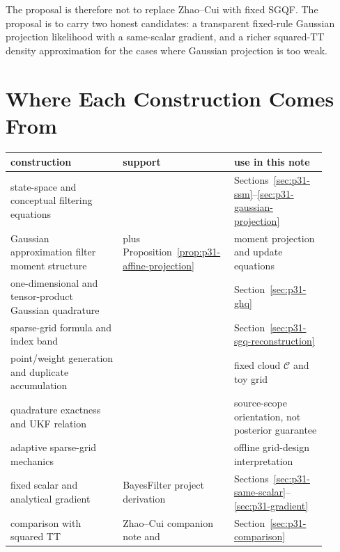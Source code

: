 \documentclass[11pt]{article}
\numberwithin{equation}{section}
\begin{document}
The proposal is therefore not to replace Zhao--Cui with fixed SGQF.  The
proposal is to carry two honest candidates: a transparent fixed-rule Gaussian
projection likelihood with a same-scalar gradient, and a richer squared-TT
density approximation for the cases where Gaussian projection is too weak.

\section{Where Each Construction Comes From}
\label{sec:p31-source-map}

\begin{center}
\small
\begin{tabular}{p{0.34\linewidth}p{0.28\linewidth}p{0.28\linewidth}}
\toprule
construction & support & use in this note \\
\midrule
state-space and conceptual filtering equations & \citet[Section 2]{jia2012sparsegrid} & Sections~\ref{sec:p31-ssm}--\ref{sec:p31-gaussian-projection} \\
Gaussian approximation filter moment structure & \citet[Eq. 15--23]{jia2012sparsegrid} plus Proposition~\ref{prop:p31-affine-projection} & moment projection and update equations \\
one-dimensional and tensor-product Gaussian quadrature & \citet[Section 2.2.1]{jia2012sparsegrid} & Section~\ref{sec:p31-ghq} \\
sparse-grid formula and index band & \citet[Eq. 26--29]{jia2012sparsegrid} & Section~\ref{sec:p31-sgq-reconstruction} \\
point/weight generation and duplicate accumulation & \citet[Algorithm 1]{jia2012sparsegrid} & fixed cloud \(\mathcal C\) and toy grid \\
quadrature exactness and UKF relation & \citet[Theorems 3.1--3.2]{jia2012sparsegrid} & source-scope orientation, not posterior guarantee \\
adaptive sparse-grid mechanics & \citet[Section 3]{singh2018adaptive} & offline grid-design interpretation \\
fixed scalar and analytical gradient & BayesFilter project derivation & Sections~\ref{sec:p31-same-scalar}--\ref{sec:p31-gradient} \\
comparison with squared TT & Zhao--Cui companion note and \citet{zhao2024ttsequential} & Section~\ref{sec:p31-comparison} \\
\bottomrule
\end{tabular}
\end{center}
\end{document}
